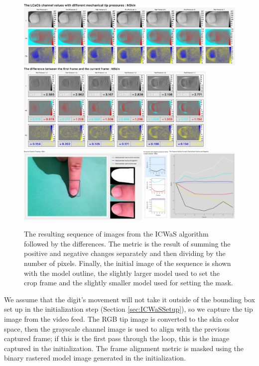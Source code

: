 \begin{figure}[h!]
  \centering
    \includegraphics[width=1.00\textwidth]{Chapter4/Figs/Final_Fig_Channels_NSkin.jpg}
    \includegraphics[width=0.86\textwidth]{Chapter4/Figs/Final_Fig_Total_Difference_NSkin.jpg}
    \includegraphics[width=1.00\textwidth]{Chapter4/Figs/Final_Fig_Misc_NSkin.jpg}
        \caption{The resulting sequence of images from the ICWaS algorithm followed by the differences. The metric is the result of summing the positive and negative changes separately and then dividing by the number of pixels. Finally, the initial image of the sequence is shown with the model outline, the slightly larger model used to set the crop frame and the slightly smaller model used for setting the mask.}\label{fig:ICWaSResultNSkin}
\end{figure}

We assume that the digit's movement will not take it outside of the bounding box set up in the initialization step (Section \ref{sec:ICWaSSetup}), so we capture the tip image from the video feed. The RGB tip image is converted to the skin color space, then the grayscale channel image is used to align with the previous captured frame; if this is the first pass through the loop, this is the image captured in the initialization. The frame alignment metric is masked using the binary rastered model image generated in the initialization.

